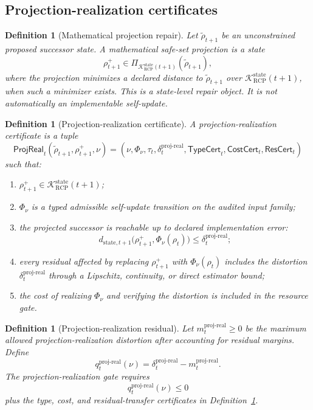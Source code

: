 \documentclass[11pt]{article}
\newtheorem{definition}[theorem]{Definition}
\newcommand{\K}{\mathcal{K}}
\newcommand{\1}{\mathbf{1}}
\newcommand{\RCP}{\mathrm{RCP}}
\newcommand{\state}{\mathrm{state}}
\providecommand{\proj}{\mathrm{proj}}
\providecommand{\real}{\mathrm{real}}
\begin{document}
\subsection{Projection-realization certificates}

\begin{definition}[Mathematical projection repair]
\label{def:mathematical_projection_repair_batch8}
Let \(\widetilde\rho_{t+1}\) be an unconstrained proposed successor state. A mathematical safe-set projection is a state
\[
\rho_{t+1}^+\in\Pi_{\K_{\RCP}^{\state}(t+1)}(\widetilde\rho_{t+1}),
\]
where the projection minimizes a declared distance to \(\widetilde\rho_{t+1}\) over \(\K_{\RCP}^{\state}(t+1)\), when such a minimizer exists. This is a state-level repair object. It is not automatically an implementable self-update.
\end{definition}

\begin{definition}[Projection-realization certificate]
\label{def:projection_realization_certificate_batch8}
A projection-realization certificate is a tuple
\[
\mathsf{ProjReal}_t(\widetilde\rho_{t+1},\rho_{t+1}^+,\nu)
=
(\nu,\Phi_\nu,\tau_t,\delta_t^{\proj\mbox{-}\real},\mathsf{TypeCert}_t,\mathsf{CostCert}_t,\mathsf{ResCert}_t)
\]
such that:
\begin{enumerate}[label=(\roman*),leftmargin=1.5em]
    \item \(\rho_{t+1}^+\in\K_{\RCP}^{\state}(t+1)\);
    \item \(\Phi_\nu\) is a typed admissible self-update transition on the audited input family;
    \item the projected successor is reachable up to declared implementation error:
    \[
    d_{\state,t+1}\bigl(\rho_{t+1}^+,\Phi_\nu(\rho_t)\bigr)
    \le
    \delta_t^{\proj\mbox{-}\real};
    \]
    \item every residual affected by replacing \(\rho_{t+1}^+\) with \(\Phi_\nu(\rho_t)\) includes the distortion \(\delta_t^{\proj\mbox{-}\real}\) through a Lipschitz, continuity, or direct estimator bound;
    \item the cost of realizing \(\Phi_\nu\) and verifying the distortion is included in the resource gate.
\end{enumerate}
\end{definition}

\begin{definition}[Projection-realization residual]
\label{def:projection_realization_residual_batch8}
Let \(m_t^{\proj\mbox{-}\real}\ge0\) be the maximum allowed projection-realization distortion after accounting for residual margins. Define
\[
q_t^{\proj\mbox{-}\real}(\nu)
=
\delta_t^{\proj\mbox{-}\real}-m_t^{\proj\mbox{-}\real}.
\]
The projection-realization gate requires
\[
q_t^{\proj\mbox{-}\real}(\nu)\le0
\]
plus the type, cost, and residual-transfer certificates in Definition~\ref{def:projection_realization_certificate_batch8}.
\end{definition}
\end{document}
